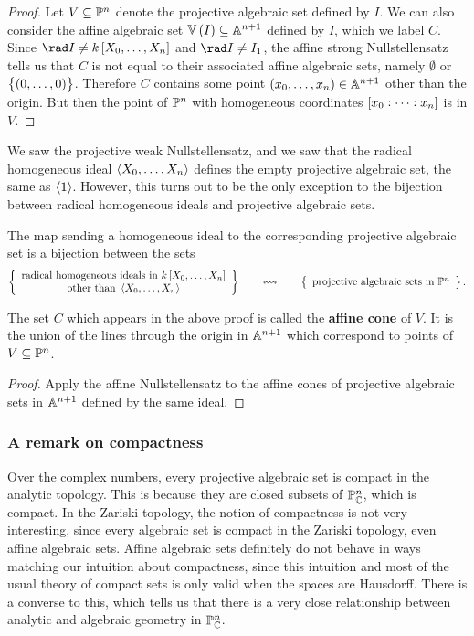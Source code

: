 \begin{proof}
Let $ V \subseteq \PP^n $ denote the projective algebraic set defined by $ I $. We can also consider the affine algebraic set $ \VV\br{I} \subseteq \AA^{n + 1} $ defined by $ I $, which we label $ C $. Since $ \rad I \ne k\sbr{X_0, \dots, X_n} $ and $ \rad I \ne I_1 $, the affine strong Nullstellensatz tells us that $ C $ is not equal to their associated affine algebraic sets, namely $ \emptyset $ or $ \cbr{\br{0, \dots, 0}} $. Therefore $ C $ contains some point $ \br{x_0, \dots, x_n} \in \AA^{n + 1} $ other than the origin. But then the point of $ \PP^n $ with homogeneous coordinates $ \sbr{x_0 : \dots : x_n} $ is in $ V $.
\end{proof}

We saw the projective weak Nullstellensatz, and we saw that the radical homogeneous ideal $ \abr{X_0, \dots, X_n} $ defines the empty projective algebraic set, the same as $ \abr{1} $. However, this turns out to be the only exception to the bijection between radical homogeneous ideals and projective algebraic sets.

\begin{theorem}
The map sending a homogeneous ideal to the corresponding projective algebraic set is a bijection between the sets
$$ \correspondence{\text{radical homogeneous ideals in} \ k\sbr{X_0, \dots, X_n} \\ \text{other than} \ \abr{X_0, \dots, X_n}}{\text{projective algebraic sets in} \ \PP^n}. $$
\end{theorem}

The set $ C $ which appears in the above proof is called the \textbf{affine cone} of $ V $. It is the union of the lines through the origin in $ \AA^{n + 1} $ which correspond to points of $ V \subseteq \PP^n $.

\begin{proof}
Apply the affine Nullstellensatz to the affine cones of projective algebraic sets in $ \AA^{n + 1} $ defined by the same ideal.
\end{proof}

\subsubsection{A remark on compactness}

Over the complex numbers, every projective algebraic set is compact in the analytic topology. This is because they are closed subsets of $ \PP_\CC^n $, which is compact. In the Zariski topology, the notion of compactness is not very interesting, since every algebraic set is compact in the Zariski topology, even affine algebraic sets. Affine algebraic sets definitely do not behave in ways matching our intuition about compactness, since this intuition and most of the usual theory of compact sets is only valid when the spaces are Hausdorff. There is a converse to this, which tells us that there is a very close relationship between analytic and algebraic geometry in $ \PP_\CC^n $.

